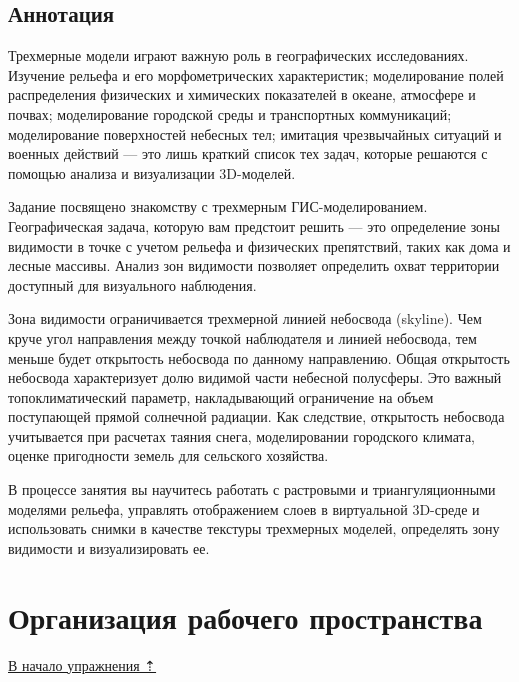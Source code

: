 \documentclass[]{book}
\theoremstyle{definition}
\theoremstyle{definition}
\theoremstyle{definition}
\theoremstyle{remark}
\begin{document}
\hypertarget{threed-modelling-annotation}{%
\subsection{Аннотация}\label{threed-modelling-annotation}}

Трехмерные модели играют важную роль в географических исследованиях.
Изучение рельефа и его морфометрических характеристик; моделирование
полей распределения физических и химических показателей в океане,
атмосфере и почвах; моделирование городской среды и транспортных
коммуникаций; моделирование поверхностей небесных тел; имитация
чрезвычайных ситуаций и военных действий --- это лишь краткий список тех
задач, которые решаются с помощью анализа и визуализации 3D-моделей.

Задание посвящено знакомству с трехмерным ГИС-моделированием.
Географическая задача, которую вам предстоит решить --- это определение
зоны видимости в точке с учетом рельефа и физических препятствий, таких
как дома и лесные массивы. Анализ зон видимости позволяет определить
охват территории доступный для визуального наблюдения.

Зона видимости ограничивается трехмерной линией небосвода (skyline). Чем
круче угол направления между точкой наблюдателя и линией небосвода, тем
меньше будет открытость небосвода по данному направлению. Общая
открытость небосвода характеризует долю видимой части небесной
полусферы. Это важный топоклиматический параметр, накладывающий
ограничение на объем поступающей прямой солнечной радиации. Как
следствие, открытость небосвода учитывается при расчетах таяния снега,
моделировании городского климата, оценке пригодности земель для
сельского хозяйства.

В процессе занятия вы научитесь работать с растровыми и
триангуляционными моделями рельефа, управлять отображением слоев в
виртуальной 3D-среде и использовать снимки в качестве текстуры
трехмерных моделей, определять зону видимости и визуализировать ее.

\hypertarget{threed-modelling-workspace}{%
\section{Организация рабочего
пространства}\label{threed-modelling-workspace}}

\protect\hyperlink{three-modelling}{В начало упражнения ⇡}
\end{document}
